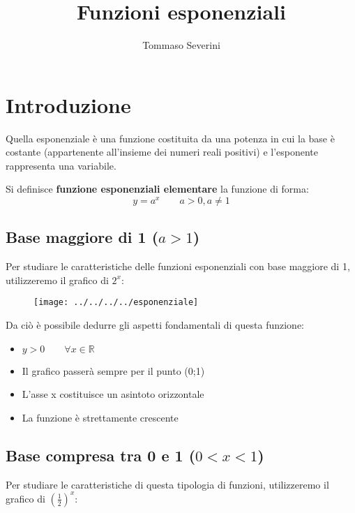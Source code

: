 \documentclass[10pt, a4paper]{article}
\author{Tommaso Severini}
\title{Funzioni esponenziali}
\theoremstyle{remark}
\begin{document}
	\maketitle
	
\section*{Introduzione}
	
	Quella esponenziale è una funzione costituita da una potenza in cui la base è costante (appartenente all'insieme dei numeri reali positivi) e l'esponente rappresenta una variabile.
	
	\begin{definition*}
		Si definisce \textbf{funzione esponenziali elementare} la funzione di forma:
		$$ y = a^x \qquad a>0, a \neq 1 $$
	\end{definition*}

\subsection*{Base maggiore di 1 ($a>1$)}

Per studiare le caratteristiche delle funzioni esponenziali con base maggiore di 1, utilizzeremo il grafico di $2^x$: 


\begin{figure}[h]
	\centering
	\texttt{[image: ../../../../esponenziale]}
	\caption*{}
	\label{fig:esponenziale}
\end{figure}

Da ciò è possibile dedurre gli aspetti fondamentali di questa funzione:

\begin{itemize}
	\item $y>0 \qquad \forall x \in \mathbb{R}$
	\item Il grafico passerà sempre per il punto (0;1)
	\item L'asse x costituisce un asintoto orizzontale
	\item La funzione è strettamente crescente
\end{itemize}

\newpage

\subsection*{Base compresa tra 0 e 1 ($0<x<1$)}

Per studiare le caratteristiche di questa tipologia di funzioni, utilizzeremo il grafico di $\left( \frac{1}{2}\right)^x$:
\end{document}
